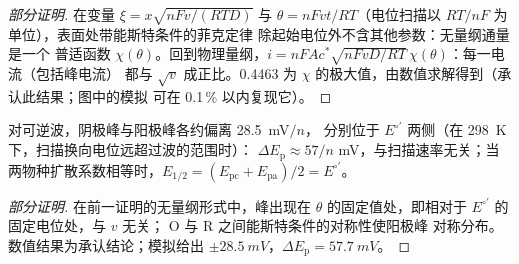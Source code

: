 \begin{proof}[部分证明]
在变量 $\xi = x\sqrt{nFv/(RTD)}$ 与 $\theta = nFvt/RT$（电位扫描以
$RT/nF$ 为单位），表面处带能斯特条件的菲克定律
除起始电位外不含其他参数：无量纲通量是一个
普适函数 $\chi(\theta)$。回到物理量纲，$i = nFAc^*\sqrt{nFvD/RT}\,\chi(\theta)$：每一电流（包括峰电流）
都与 $\sqrt v$ 成正比。0.4463 为
$\chi$ 的极大值，由数值求解得到（承认此结果；图中的模拟
可在 0.1\,\% 以内复现它）。
\end{proof}

\begin{proposition}[峰间距]\label{prop:b3:electrode-kinetics:delta-ep}
对可逆波，阴极峰与阳极峰各约偏离 \qty{28.5}{mV}$/n$，
分别位于 $E^{\circ\prime}$ 两侧（在 \qty{298}{K} 下，扫描换向电位远超过波的范围时）：
$\Delta E_{\mathrm p} \approx 57/n$ mV，与扫描速率无关；当两物种扩散系数相等时，$E_{1/2} = (E_{\mathrm{pc}} + E_{\mathrm{pa}})/2 =
E^{\circ\prime}$。
\end{proposition}

\begin{proof}[部分证明]
在前一证明的无量纲形式中，峰出现在
$\theta$ 的固定值处，即相对于 $E^{\circ\prime}$ 的固定电位处，与 $v$ 无关；
O 与 R 之间能斯特条件的对称性使阳极峰
对称分布。数值结果为承认结论；模拟给出
$\pm\qty{28.5}{mV}$，$\Delta E_{\mathrm p} = \qty{57.7}{mV}$。
\end{proof}

